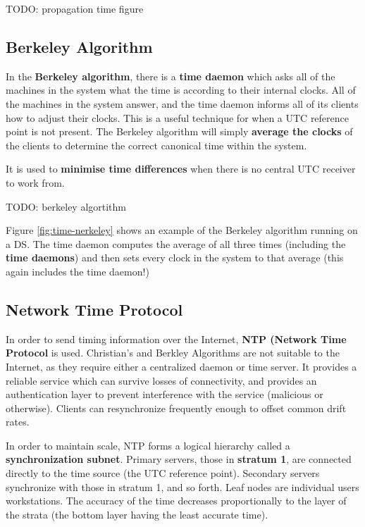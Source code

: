 \documentclass{article}
\begin{document}
TODO: propagation time figure

\subsection{Berkeley Algorithm}

In the \textbf{Berkeley algorithm}, there is a \textbf{time daemon} which asks all of the machines in the system what the time is according to their internal clocks. All of the machines in the system answer, and the time daemon informs all of its clients how to adjust their clocks. This is a useful technique for when a UTC reference point is not present. The Berkeley algorithm will simply \textbf{average the clocks} of the clients to determine the correct canonical time within the system.

It is used to \textbf{minimise time differences} when there is no central UTC receiver to work from.

TODO: berkeley algortithm

Figure \ref{fig:time-nerkeley} shows an example of the Berkeley algorithm running on a DS. The time daemon computes the average of all three times (including the \textbf{time daemons}) and then sets every clock in the system to that average (this again includes the time daemon!)

\subsection{Network Time Protocol}

In order to send timing information over the Internet, \textbf{NTP (Network Time Protocol} is used. Christian's and Berkley Algorithms are not suitable to the Internet, as they require either a centralized daemon or time server. It provides a reliable service which can survive losses of connectivity, and provides an authentication layer to prevent interference with the service (malicious or otherwise). Clients can resynchronize frequently enough to offset common drift rates.

In order to maintain scale, NTP forms a logical hierarchy called a \textbf{synchronization subnet}. Primary servers, those in \textbf{stratum 1}, are connected directly to the time source (the UTC reference point). Secondary servers synchronize with those in stratum 1, and so forth. Leaf nodes are individual users workstations. The accuracy of the time decreases proportionally to the layer of the strata (the bottom layer having the least accurate time). 
\end{document}
